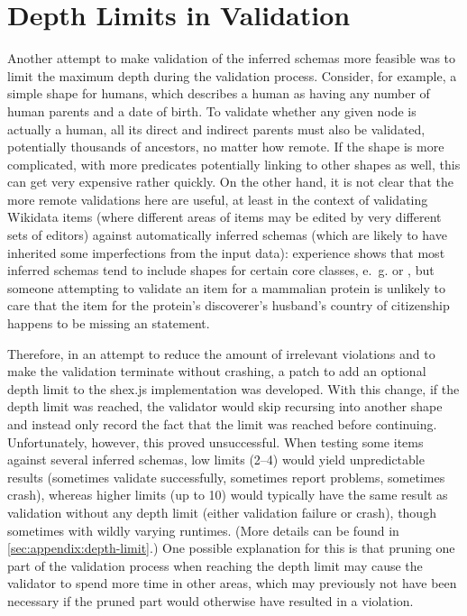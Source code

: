 \section{Depth Limits in Validation}
\label{sec:RDF2Graph+Wikidata:depth-limit}

Another attempt to make validation of the inferred \glspl{schema} more feasible
was to limit the maximum depth during the validation process.
Consider, for example, a simple \gls{shape} for humans, %
which describes a human as having any number of human parents and a date of birth.
To validate whether any given node is actually a human,
all its direct and indirect parents must also be validated,
potentially thousands of ancestors, no matter how remote.
If the \gls{shape} is more complicated,
with more predicates potentially linking to other \glspl{shape} as well,
this can get very expensive rather quickly.
On the other hand, it is not clear that the more remote validations here are useful,
at least in the context of validating \gls{Wikidata} \glspl{item}
(where different areas of \glspl{item} may be edited by very different sets of editors)
against automatically inferred \glspl{schema}
(which are likely to have inherited some imperfections from the input data): %
experience shows that %
most inferred \glspl{schema} tend to include \glspl{shape} for certain core classes,
e.~g.  or ,
but someone attempting to validate an \gls{item} for a mammalian protein
is unlikely to care that the \gls{item} for the protein’s discoverer’s husband’s country of citizenship
happens to be missing an  statement.

Therefore, in an attempt to reduce the amount of irrelevant violations
and to make the validation terminate without crashing,
a patch to add an optional depth limit to the shex.js implementation was developed.
With this change, if the depth limit was reached,
the validator would skip recursing into another \gls{shape}
and instead only record the fact that the limit was reached before continuing.
Unfortunately, however, this proved unsuccessful.
When testing some \glspl{item} against several inferred \glspl{schema},
low limits (2–4) would yield unpredictable results
(sometimes validate successfully, sometimes report problems, sometimes crash),
whereas higher limits (up to 10) would typically have the same result as validation without any depth limit
(either validation failure or crash),
though sometimes with wildly varying runtimes.
(More details can be found in \cref{sec:appendix:depth-limit}.)
One possible explanation for this is that pruning one part of the validation process when reaching the depth limit
may cause the validator to spend more time in other areas,
which may previously not have been necessary if the pruned part would otherwise have resulted in a violation.

